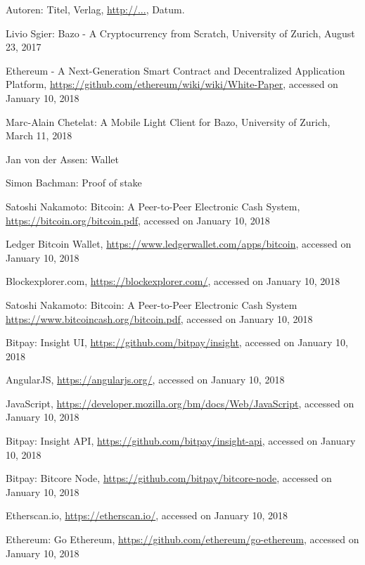 \begin{thebibliography}{99}

 Autoren: Titel, Verlag, \url{http://...}, Datum.

 Livio Sgier: Bazo - A Cryptocurrency from Scratch, University of Zurich, August 23, 2017

 Ethereum - A Next-Generation Smart Contract and Decentralized Application Platform, \url{https://github.com/ethereum/wiki/wiki/White-Paper}, accessed on January 10, 2018

 Marc-Alain Chetelat: A Mobile Light Client for Bazo, University of Zurich, March 11, 2018

 Jan von der Assen: Wallet

 Simon Bachman: Proof of stake

 Satoshi Nakamoto: Bitcoin: A Peer-to-Peer Electronic Cash System, \url{https://bitcoin.org/bitcoin.pdf}, accessed on January 10, 2018

 Ledger Bitcoin Wallet, \url{https://www.ledgerwallet.com/apps/bitcoin}, accessed on January 10, 2018

 Blockexplorer.com, \url{https://blockexplorer.com/}, accessed on January 10, 2018

 Satoshi Nakamoto: Bitcoin: A Peer-to-Peer Electronic Cash System \url{https://www.bitcoincash.org/bitcoin.pdf}, accessed on January 10, 2018

 Bitpay: Insight UI, \url{https://github.com/bitpay/insight}, accessed on January 10, 2018

 AngularJS, \url{https://angularjs.org/}, accessed on January 10, 2018

 JavaScript, \url{https://developer.mozilla.org/bm/docs/Web/JavaScript}, accessed on January 10, 2018

 Bitpay: Insight API, \url{https://github.com/bitpay/insight-api}, accessed on January 10, 2018

 Bitpay: Bitcore Node, \url{https://github.com/bitpay/bitcore-node}, accessed on January 10, 2018

 Etherscan.io, \url{https://etherscan.io/}, accessed on January 10, 2018

 Ethereum: Go Ethereum, \url{https://github.com/ethereum/go-ethereum}, accessed on January 10, 2018


\end{thebibliography}
